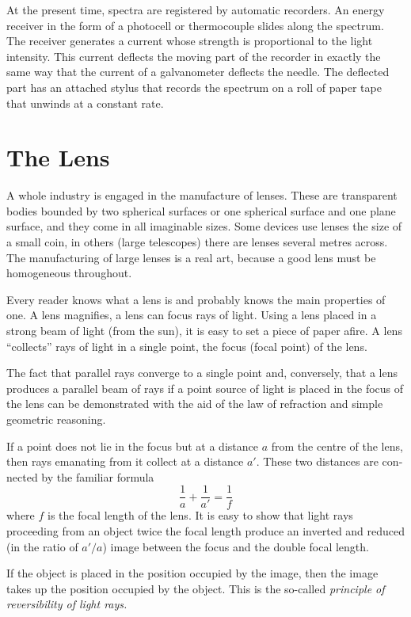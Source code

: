 At the present time, spectra are registered by automatic recorders. An energy receiver in the form of a photocell or thermocouple slides along the spectrum. The receiver generates a current whose strength is proportional to the light intensity. This current deflects the moving part of the recorder in exactly the same way that the current of a galvanometer deflects the needle. The deflected part has an attached stylus that records the spectrum on a roll of paper tape that unwinds at a constant rate.

\section{The Lens}

A whole industry is engaged in the manufacture of lenses. These are transparent bodies bounded by two spher­ical surfaces or one spherical surface and one plane surface, and they come in all imaginable sizes. Some devices use lenses the size of a small coin, in others (large tele­scopes) there are lenses several metres across. The manu­facturing of large lenses is a real art, because a good lens must be homogeneous throughout.


Every reader knows what a lens is and probably knows the main properties of one. A lens magnifies, a lens can focus rays of light. Using a lens placed in a strong beam of light (from the sun), it is easy to set a piece of paper afire. A lens ``collects'' rays of light in a single point, the focus (focal point) of the lens.

The fact that parallel rays converge to a single point and, conversely, that a lens produces a parallel beam of rays if a point source of light is placed in the focus of the lens can be demonstrated with the aid of the law of refraction and simple geometric reasoning.

If a point does not lie in the focus but at a distance $a$ from the centre of the lens, then rays emanating from it collect at a distance $a'$. These two distances are con­nected by the familiar formula
\begin{equation*}%
\frac{1}{a} + \frac{1}{a'} = \frac{1}{f}  
\end{equation*}
where $f$ is the focal length of the lens. It is easy to show that light rays proceeding from an object twice the focal length produce an inverted and reduced (in the ratio of $a'/a$) image between the focus and the double focal length.

If the object is placed in the position occupied by the image, then the image takes up the position occupied by the object. This is the so-called \emph{principle of reversibility of light rays.}

